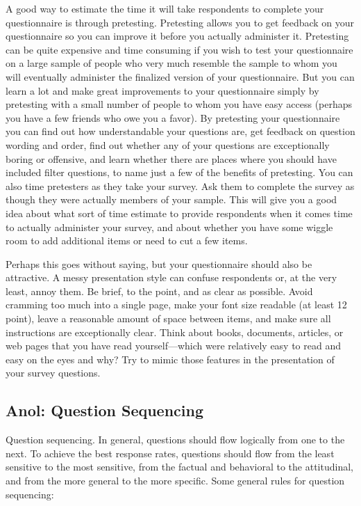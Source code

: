 A good way to estimate the time it will take respondents to complete your questionnaire is through pretesting. Pretesting allows you to get feedback on your questionnaire so you can improve it before you actually administer it. Pretesting can be quite expensive and time consuming if you wish to test your questionnaire on a large sample of people who very much resemble the sample to whom you will eventually administer the finalized version of your questionnaire. But you can learn a lot and make great improvements to your questionnaire simply by pretesting with a small number of people to whom you have easy access (perhaps you have a few friends who owe you a favor). By pretesting your questionnaire you can find out how understandable your questions are, get feedback on question wording and order, find out whether any of your questions are exceptionally boring or offensive, and learn whether there are places where you should have included filter questions, to name just a few of the benefits of pretesting. You can also time pretesters as they take your survey. Ask them to complete the survey as though they were actually members of your sample. This will give you a good idea about what sort of time estimate to provide respondents when it comes time to actually administer your survey, and about whether you have some wiggle room to add additional items or need to cut a few items.

Perhaps this goes without saying, but your questionnaire should also be attractive. A messy presentation style can confuse respondents or, at the very least, annoy them. Be brief, to the point, and as clear as possible. Avoid cramming too much into a single page, make your font size readable (at least 12 point), leave a reasonable amount of space between items, and make sure all instructions are exceptionally clear. Think about books, documents, articles, or web pages that you have read yourself—which were relatively easy to read and easy on the eyes and why? Try to mimic those features in the presentation of your survey questions.

\subsection{Anol: Question Sequencing}

Question sequencing. In general, questions should flow logically from one to the next. To achieve the best response rates, questions should flow from the least sensitive to the most sensitive, from the factual and behavioral to the attitudinal, and from the more general to the more specific. Some general rules for question sequencing:

